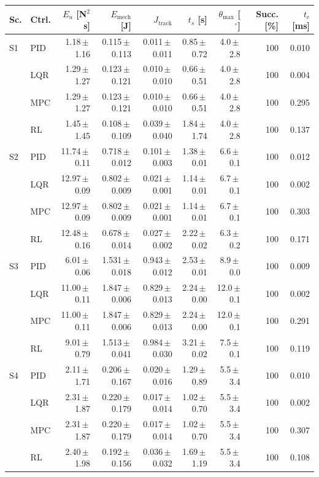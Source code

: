 \begin{tabular}{llrrrrrrr}
\toprule
Sc. & Ctrl. & $E_u$ [N$^2$s] & $E_\mathrm{mech}$ [J] & $J_\mathrm{track}$ & $t_s$ [s] & $\theta_\mathrm{max}$ [$^\circ$] & Succ. [\%] & $t_c$ [ms] \\
\midrule
S1 & PID & 1.18\,$\pm$\,1.16 & 0.115\,$\pm$\,0.113 & 0.011\,$\pm$\,0.011 & 0.85\,$\pm$\,0.72 & 4.0\,$\pm$\,2.8 & 100 & 0.010 \\
 & LQR & 1.29\,$\pm$\,1.27 & 0.123\,$\pm$\,0.121 & 0.010\,$\pm$\,0.010 & 0.66\,$\pm$\,0.51 & 4.0\,$\pm$\,2.8 & 100 & 0.004 \\
 & MPC & 1.29\,$\pm$\,1.27 & 0.123\,$\pm$\,0.121 & 0.010\,$\pm$\,0.010 & 0.66\,$\pm$\,0.51 & 4.0\,$\pm$\,2.8 & 100 & 0.295 \\
 & RL & 1.45\,$\pm$\,1.45 & 0.108\,$\pm$\,0.109 & 0.039\,$\pm$\,0.040 & 1.84\,$\pm$\,1.74 & 4.0\,$\pm$\,2.8 & 100 & 0.137 \\
\midrule
S2 & PID & 11.74\,$\pm$\,0.11 & 0.718\,$\pm$\,0.012 & 0.101\,$\pm$\,0.003 & 1.38\,$\pm$\,0.01 & 6.6\,$\pm$\,0.1 & 100 & 0.012 \\
 & LQR & 12.97\,$\pm$\,0.09 & 0.802\,$\pm$\,0.009 & 0.021\,$\pm$\,0.001 & 1.14\,$\pm$\,0.01 & 6.7\,$\pm$\,0.1 & 100 & 0.002 \\
 & MPC & 12.97\,$\pm$\,0.09 & 0.802\,$\pm$\,0.009 & 0.021\,$\pm$\,0.001 & 1.14\,$\pm$\,0.01 & 6.7\,$\pm$\,0.1 & 100 & 0.303 \\
 & RL & 12.48\,$\pm$\,0.16 & 0.678\,$\pm$\,0.014 & 0.027\,$\pm$\,0.002 & 2.22\,$\pm$\,0.02 & 6.3\,$\pm$\,0.2 & 100 & 0.171 \\
\midrule
S3 & PID & 6.01\,$\pm$\,0.06 & 1.531\,$\pm$\,0.018 & 0.943\,$\pm$\,0.012 & 2.53\,$\pm$\,0.01 & 8.9\,$\pm$\,0.0 & 100 & 0.009 \\
 & LQR & 11.00\,$\pm$\,0.11 & 1.847\,$\pm$\,0.006 & 0.829\,$\pm$\,0.013 & 2.24\,$\pm$\,0.00 & 12.0\,$\pm$\,0.1 & 100 & 0.002 \\
 & MPC & 11.00\,$\pm$\,0.11 & 1.847\,$\pm$\,0.006 & 0.829\,$\pm$\,0.013 & 2.24\,$\pm$\,0.00 & 12.0\,$\pm$\,0.1 & 100 & 0.291 \\
 & RL & 9.01\,$\pm$\,0.79 & 1.513\,$\pm$\,0.041 & 0.984\,$\pm$\,0.030 & 3.21\,$\pm$\,0.02 & 7.5\,$\pm$\,0.1 & 100 & 0.119 \\
\midrule
S4 & PID & 2.11\,$\pm$\,1.71 & 0.206\,$\pm$\,0.167 & 0.020\,$\pm$\,0.016 & 1.29\,$\pm$\,0.89 & 5.5\,$\pm$\,3.4 & 100 & 0.010 \\
 & LQR & 2.31\,$\pm$\,1.87 & 0.220\,$\pm$\,0.179 & 0.017\,$\pm$\,0.014 & 1.02\,$\pm$\,0.70 & 5.5\,$\pm$\,3.4 & 100 & 0.002 \\
 & MPC & 2.31\,$\pm$\,1.87 & 0.220\,$\pm$\,0.179 & 0.017\,$\pm$\,0.014 & 1.02\,$\pm$\,0.70 & 5.5\,$\pm$\,3.4 & 100 & 0.307 \\
 & RL & 2.40\,$\pm$\,1.98 & 0.192\,$\pm$\,0.156 & 0.036\,$\pm$\,0.032 & 1.69\,$\pm$\,1.19 & 5.5\,$\pm$\,3.4 & 100 & 0.108 \\
\bottomrule
\end{tabular}

